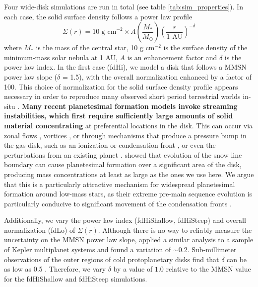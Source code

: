 \documentclass[twocolumn,linenumbers]{aastex63}
\begin{document}
Four wide-disk simulations are run in total (see table \ref{tab:sim_properties}). In each case, the solid surface density follows a power law profile
\begin{equation}
	\Sigma(r) = \textrm{10 g cm}^{-2} \times A \left( \frac{M_{*}}{M_{\odot}} \right) \left( \frac{r}{\textrm{1 AU}} \right)^{-\delta}
\end{equation}
where $M_{*}$ is the mass of the central star, 10 g
cm$^{-2}$ is the surface density of the minimum-mass solar nebula
\citep[MMSN]{hayashi81} at 1 AU, $A$ is an enhancement factor and $\delta$ is the power law index.
In the first case (fdHi), we model a disk that follows a MMSN power law slope ($\delta$ = 1.5), with the overall normalization enhanced by a factor of 100. This choice of normalization for the solid surface density profile appears necessary in order to reproduce many observed short period terrestrial worlds in-situ \citep{hansen12}. \textbf{Many recent planetesimal formation models invoke streaming instabilities, which first require sufficiently large amounts of solid material concentrating} at preferential locations in the disk. This can occur via zonal flows \citep{johansen2009b, simon12}, vortices \citep{klahr03}, or through mechanisms that produce a pressure bump in the gas disk, such as an ionization \citep{lyra08} or condensation front \citep{brauer08b, drkazowska13}, or even the perturbations from an existing planet \citep{shibaike20}. \citet{drkazowska18} showed that evolution of the snow line boundary can cause planetesimal formation over a significant area of the disk, producing mass concentrations at least as large as the ones we use here. We argue that this is a particularly attractive mechanism for widespread planetesimal formation around low-mass stars, as their extreme pre-main sequence evolution is particularly conducive to significant movement of the condensation fronts \citep{baraffe15}.

Additionally, we vary the power law index (fdHiShallow, fdHiSteep) and overall normalization (fdLo) of $\Sigma(r)$. Although there is no way to reliably measure the uncertainty on the MMSN power law slope, \citet{chiang13} applied a similar analysis to a sample of Kepler multiplanet systems and found a variation of $\sim 0.2$. Sub-millimeter observations of the outer regions of cold protoplanetary disks find that $\delta$ can be as low as 0.5 \citep{mundy00, andrews09, andrews10}. Therefore, we vary $\delta$ by a value of $1.0$ relative to the MMSN value for the fdHiShallow and fdHiSteep simulations.
\end{document}
